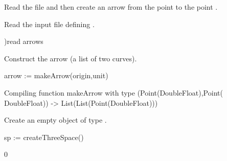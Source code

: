 Read the file and then create
an arrow from the point  to the point .
\begin{xtc}
\begin{xtccomment}
Read the input file defining .
\end{xtccomment}
\begin{spadsrc}
)read arrows
\end{spadsrc}
\begin{TeXOutput}
\begin{fricasmath}{6}
%
\end{fricasmath}
\end{TeXOutput}
\begin{TeXOutput}
\begin{fricasmath}{7}
%
\end{fricasmath}
\end{TeXOutput}
\end{xtc}
\begin{xtc}
\begin{xtccomment}
Construct the arrow (a list of two curves).
\end{xtccomment}
\begin{spadsrc}
arrow := makeArrow(origin,unit)
\end{spadsrc}
\begin{MessageOutput}
   Compiling function makeArrow with type (Point(DoubleFloat),Point(
      DoubleFloat)) -> List(List(Point(DoubleFloat))) 
\end{MessageOutput}
\begin{TeXOutput}
\begin{fricasmath}{9}
%
\end{fricasmath}
\end{TeXOutput}
\end{xtc}
\begin{xtc}
\begin{xtccomment}
Create an empty object  of type .
\end{xtccomment}
\begin{spadsrc}
sp := createThreeSpace()
\end{spadsrc}
\begin{TeXOutput}
\begin{fricasmath}{10}
0%
\end{fricasmath}
\end{TeXOutput}
\end{xtc}
